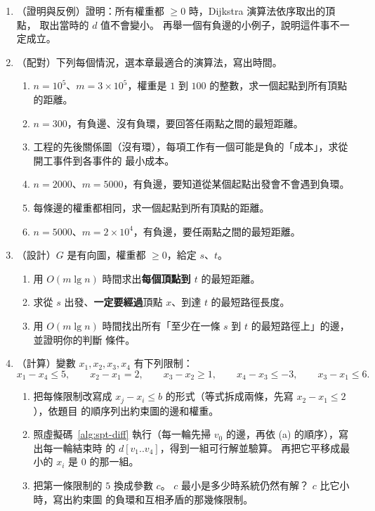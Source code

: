 \begin{enumerate}
\item \label{spt-q-mono}（證明與反例）證明：所有權重都 $\ge 0$ 時，Dijkstra 演算法依序取出的頂點，
取出當時的 $d$ 值不會變小。 再舉一個有負邊的小例子，說明這件事不一定成立。

\item \label{spt-q-choose}（配對）下列每個情況，選本章最適合的演算法，寫出時間。
\begin{enumerate}
\item $n = 10^5$、$m = 3 \times 10^5$，權重是 $1$ 到 $100$ 的整數，求一個起點到所有頂點的距離。
\item $n = 300$，有負邊、沒有負環，要回答任兩點之間的最短距離。
\item 工程的先後關係圖（沒有環），每項工作有一個可能是負的「成本」，求從開工事件到各事件的
最小成本。
\item $n = 2000$、$m = 5000$，有負邊，要知道從某個起點出發會不會遇到負環。
\item 每條邊的權重都相同，求一個起點到所有頂點的距離。
\item $n = 5000$、$m = 2 \times 10^4$，有負邊，要任兩點之間的最短距離。
\end{enumerate}

\item \label{spt-q-via}（設計）$G$ 是有向圖，權重都 $\ge 0$，給定 $s$、$t$。
\begin{enumerate}
\item 用 $O(m \lg n)$ 時間求出\textbf{每個頂點到 $t$} 的最短距離。
\item 求從 $s$ 出發、\textbf{一定要經過}頂點 $x$、到達 $t$ 的最短路徑長度。
\item 用 $O(m \lg n)$ 時間找出所有「至少在一條 $s$ 到 $t$ 的最短路徑上」的邊，並證明你的判斷
條件。
\end{enumerate}
\item \label{spt-q-diff}（計算）變數 $x_1, x_2, x_3, x_4$ 有下列限制：
\[
x_1 - x_4 \le 5, \qquad x_2 - x_1 = 2, \qquad x_3 - x_2 \ge 1, \qquad x_4 - x_3 \le -3, \qquad
x_3 - x_1 \le 6.
\]
\begin{enumerate}
\item 把每條限制改寫成 $x_j - x_i \le b$ 的形式（等式拆成兩條，先寫 $x_2 - x_1 \le 2$），依題目
的順序列出約束圖的邊和權重。
\item 照虛擬碼~\ref{alg:spt-diff} 執行（每一輪先掃 $v_0$ 的邊，再依 (a) 的順序），寫出每一輪結束時
的 $d[v_1..v_4]$，得到一組可行解並驗算。 再把它平移成最小的 $x_i$ 是 $0$ 的那一組。
\item 把第一條限制的 $5$ 換成參數 $c$。 $c$ 最小是多少時系統仍然有解？ $c$ 比它小時，寫出約束圖
的負環和互相矛盾的那幾條限制。
\end{enumerate}


\end{enumerate}
